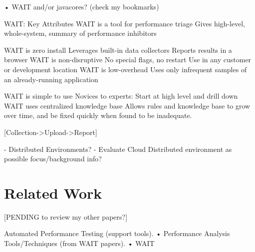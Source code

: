 \documentclass[runningheads,a4paper]{llncs}
\begin{document}
•	WAIT and/or javacores? (check my bookmarks)

WAIT:  Key Attributes
WAIT is a tool for performance triage
Gives high-level, whole-system, summary of performance inhibitors

WAIT is zero install
Leverages built-in data collectors
Reports results in a browser 					           
WAIT is non-disruptive
No special flags, no restart
Use in any customer or development location
WAIT is low-overhead
Uses only infrequent samples of an already-running application

WAIT is simple to use
Novices to experts:  Start at high level and drill down
WAIT uses centralized knowledge base
Allows rules and knowledge base to grow over time,
and be fixed quickly when found to be inadequate.

[Collection->Upload->Report]

- Distributed Environments? - Evaluate Cloud Distributed environment as possible focus/background info?




\section{Related Work}

[PENDING to review my other papers?]

Automated Performance Testing (support tools).
•	Performance Analysis Tools/Techniques (from WAIT papers).
•	WAIT
\end{document}
